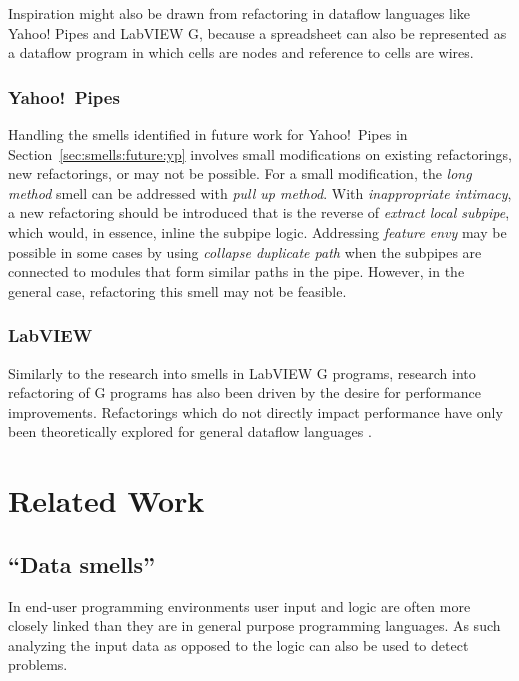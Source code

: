 \documentclass[10pt,conference,compsocconf]{IEEEtran}
\begin{document}
Inspiration might also be drawn from refactoring in dataflow languages like Yahoo! Pipes and LabVIEW G, because a spreadsheet can also be represented as a dataflow program in which cells are nodes and reference to cells are wires.

\subsubsection{Yahoo!\ Pipes}
Handling the smells identified in future work for Yahoo!\ Pipes in Section~\ref{sec:smells:future:yp} involves small modifications on existing refactorings, new refactorings, or may not be possible. For a small modification, the \emph{long method} smell can be addressed with \emph{pull up method}. 
With \emph{inappropriate intimacy}, a new refactoring should be introduced that is the reverse of \emph{extract local subpipe}, which would, in essence, inline the subpipe logic. 
Addressing \emph{feature envy} may be possible in some cases by using \emph{collapse duplicate path} when the subpipes are connected to modules that form similar paths in the pipe. However, in the general case, refactoring this smell may not be feasible. 


\subsubsection{LabVIEW}

Similarly to the research into smells in LabVIEW G programs, research into refactoring of G programs has also been driven by the desire for performance improvements. Refactorings which do not directly impact performance have only been theoretically explored for general dataflow languages \cite{sui2008automated}.

\section{Related Work}
\label{sec:related_work}

\subsection{``Data smells''}
\label{subsec:related_datasmells}

In end-user programming environments user input and logic are often more closely linked than they are in general purpose programming languages.
As such analyzing the input data as opposed to the logic can also be used to detect problems.
\end{document}
